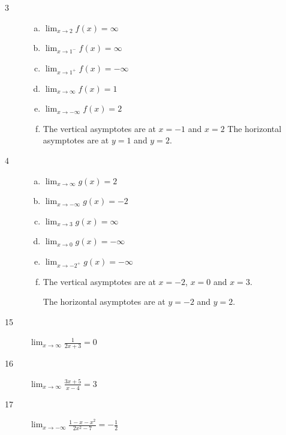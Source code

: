 \documentclass[letterpaper]{exam}
\begin{document}
    \begin{description}

      \item[3] 
        \begin{enumerate}[(a)]
          \item $\lim_{x \to 2} f(x) = \infty$
          \item $\lim_{x \to 1^-} f(x) = \infty$
          \item $\lim_{x \to 1^+} f(x) = -\infty$
          \item $\lim_{x \to \infty} f(x) = 1$
          \item $\lim_{x \to -\infty} f(x) = 2$

          \item The vertical asymptotes are at $x = -1$ and $x = 2$
            The horizontal asymptotes are at $y = 1$ and $y = 2$.

        \end{enumerate}

      \item[4] 
        \begin{enumerate}[(a)]
          \item $\lim_{x \to \infty} g(x) = 2$

          \item $\lim_{x \to -\infty} g(x) = -2$

          \item $\lim_{x \to 3} g(x) = \infty$

          \item $\lim_{x \to 0} g(x) = -\infty$

          \item $\lim_{x \to -2^+} g(x) = -\infty$

          \item The vertical asymptotes are at $x = -2$, $x = 0$ and $x = 3$.

            The horizontal asymptotes are at $y = -2$ and $y = 2$.

        \end{enumerate}

      \item[15] 
        $\lim_{x \to \infty} \frac{1}{2x + 3} = \boxed{ 0 }$

      \item[16] 
        $\lim_{x \to \infty} \frac{3x + 5}{x - 4} = \boxed{ 3 }$

      \item[17] 
        $\lim_{x \to -\infty} \frac{1 - x - x^2}{2x^2 - 7} = \boxed{ - \frac{1}{2} }$


\end{description}
\end{document}
